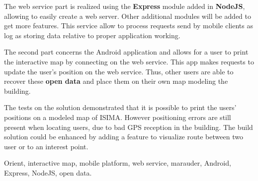 The web service part is realized using the \textbf{Express} module added in \textbf{NodeJS}, allowing to easily create a web server. Other additional modules will be added to get more features. This service allow to process requests send by mobile clients as log as storing data relative to proper application working.

The second part concerns the Android application and allows for a user to print the interactive map by connecting on the web service. This app makes requests to update the user's position on the web service. Thus, other users are able to recover these \textbf{open data} and place them on their own map modeling the building.

The tests on the solution demonstrated that it is possible to print the users' positions on a modeled map of ISIMA. However positioning errors are still present when locating users, due to bad GPS reception in the building. The build solution could be enhanced by adding a feature to visualize route between two user or to an interest point.

Orient, interactive map, mobile platform, web service, marauder, Android, Express, NodeJS, open data.
